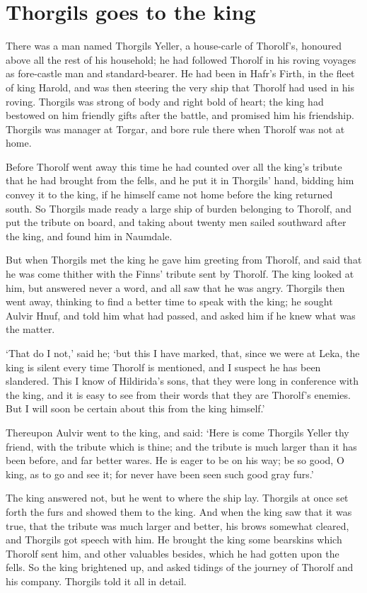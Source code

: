 \chapter{Thorgils goes to the king}
There was a man named Thorgils Yeller, a house-carle of Thorolf's, honoured above all the rest of his household; he had followed Thorolf in his roving voyages as fore-castle man and standard-bearer. He had been in Hafr's Firth, in the fleet of king Harold, and was then steering the very ship that Thorolf had used in his roving. Thorgils was strong of body and right bold of heart; the king had bestowed on him friendly gifts after the battle, and promised him his friendship. Thorgils was manager at Torgar, and bore rule there when Thorolf was not at home.

Before Thorolf went away this time he had counted over all the king's tribute that he had brought from the fells, and he put it in Thorgils' hand, bidding him convey it to the king, if he himself came not home before the king returned south. So Thorgils made ready a large ship of burden belonging to Thorolf, and put the tribute on board, and taking about twenty men sailed southward after the king, and found him in Naumdale.

But when Thorgils met the king he gave him greeting from Thorolf, and said that he was come thither with the Finns' tribute sent by Thorolf. The king looked at him, but answered never a word, and all saw that he was angry. Thorgils then went away, thinking to find a better time to speak with the king; he sought Aulvir Hnuf, and told him what had passed, and asked him if he knew what was the matter.

`That do I not,' said he; `but this I have marked, that, since we were at Leka, the king is silent every time Thorolf is mentioned, and I suspect he has been slandered. This I know of Hildirida's sons, that they were long in conference with the king, and it is easy to see from their words that they are Thorolf's enemies. But I will soon be certain about this from the king himself.'

Thereupon Aulvir went to the king, and said: `Here is come Thorgils Yeller thy friend, with the tribute which is thine; and the tribute is much larger than it has been before, and far better wares. He is eager to be on his way; be so good, O king, as to go and see it; for never have been seen such good gray furs.'

The king answered not, but he went to where the ship lay. Thorgils at once set forth the furs and showed them to the king. And when the king saw that it was true, that the tribute was much larger and better, his brows somewhat cleared, and Thorgils got speech with him. He brought the king some bearskins which Thorolf sent him, and other valuables besides, which he had gotten upon the fells. So the king brightened up, and asked tidings of the journey of Thorolf and his company. Thorgils told it all in detail.

